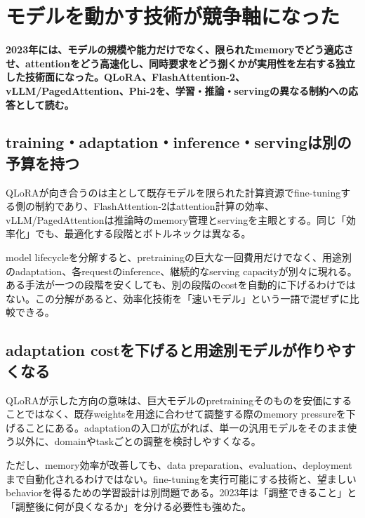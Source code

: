 \section{モデルを動かす技術が競争軸になった}
\label{pkg:runtime-adaptation}
\noindent\textbf{2023年には、モデルの規模や能力だけでなく、限られたmemoryでどう適応させ、attentionをどう高速化し、同時要求をどう捌くかが実用性を左右する独立した技術面になった。QLoRA、FlashAttention-2、vLLM/PagedAttention、Phi-2を、学習・推論・servingの異なる制約への応答として読む。}\autocite{src-1ab9d44a819a,src-5e1a3a4fc45b,src-6e61359d2fae,src-7f830e688335,src-e03b0ba5b24e,src-fb804ac849e4}

\subsection{training・adaptation・inference・servingは別の予算を持つ}

QLoRAが向き合うのは主として既存モデルを限られた計算資源でfine-tuningする側の制約であり、FlashAttention-2はattention計算の効率、vLLM/PagedAttentionは推論時のmemory管理とservingを主眼とする。同じ「効率化」でも、最適化する段階とボトルネックは異なる。\autocite{src-1ab9d44a819a,src-5e1a3a4fc45b,src-7f830e688335,src-e03b0ba5b24e,src-fb804ac849e4}


model lifecycleを分解すると、pretrainingの巨大な一回費用だけでなく、用途別のadaptation、各requestのinference、継続的なserving capacityが別々に現れる。ある手法が一つの段階を安くしても、別の段階のcostを自動的に下げるわけではない。この分解があると、効率化技術を「速いモデル」という一語で混ぜずに比較できる。\autocite{src-1ab9d44a819a,src-5e1a3a4fc45b,src-7f830e688335,src-e03b0ba5b24e,src-fb804ac849e4}


\subsection{adaptation costを下げると用途別モデルが作りやすくなる}

QLoRAが示した方向の意味は、巨大モデルのpretrainingそのものを安価にすることではなく、既存weightsを用途に合わせて調整する際のmemory pressureを下げることにある。adaptationの入口が広がれば、単一の汎用モデルをそのまま使う以外に、domainやtaskごとの調整を検討しやすくなる。\autocite{src-7f830e688335}


ただし、memory効率が改善しても、data preparation、evaluation、deploymentまで自動化されるわけではない。fine-tuningを実行可能にする技術と、望ましいbehaviorを得るための学習設計は別問題である。2023年は「調整できること」と「調整後に何が良くなるか」を分ける必要性も強めた。\autocite{src-7f830e688335}



